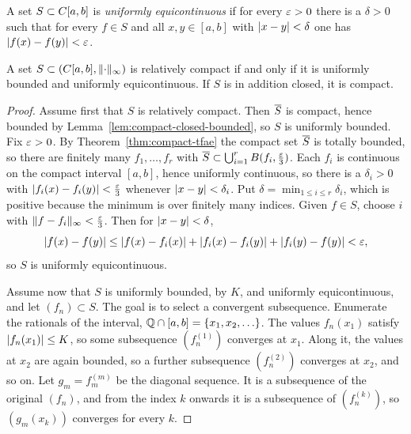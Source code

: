 \begin{definition}\label{def:equicont}
A set $S \subset C[a,b]$ is \emph{uniformly equicontinuous} if for every
$\varepsilon > 0$ there is a $\delta > 0$ such that for every $f \in S$ and all
$x, y \in [a,b]$ with $\lvert x-y\rvert < \delta$ one has
$\lvert f(x) - f(y)\rvert < \varepsilon$.
\end{definition}

\begin{theorem}\label{thm:arzela-ascoli}
A set $S \subset (C[a,b], \lVert\cdot\rVert_\infty)$ is relatively compact if
and only if it is uniformly bounded and uniformly equicontinuous. If $S$ is
in addition closed, it is compact.
\end{theorem}

\begin{proof}
Assume first that $S$ is relatively compact. Then $\overline{S}$ is compact, hence
bounded by Lemma~\ref{lem:compact-closed-bounded}, so $S$ is uniformly
bounded. Fix $\varepsilon > 0$. By Theorem~\ref{thm:compact-tfae} the compact set
$\overline{S}$ is totally bounded, so there are finitely many
$f_1, \dots, f_r$ with
$\overline{S} \subset \bigcup_{i=1}^{r} B(f_i, \frac{\varepsilon}{3})$. Each $f_i$ is
continuous on the compact interval $[a,b]$, hence uniformly continuous, so
there is a $\delta_i > 0$ with
$\lvert f_i(x) - f_i(y)\rvert < \frac{\varepsilon}{3}$ whenever $\lvert x - y\rvert < \delta_i$.
Put $\delta = \min_{1 \le i \le r} \delta_i$, which is positive because the
minimum is over finitely many indices. Given $f \in S$, choose $i$ with
$\lVert f - f_i\rVert_\infty < \frac{\varepsilon}{3}$. Then for $\lvert x-y\rvert < \delta$,
\[
  \lvert f(x) - f(y)\rvert
  \le \lvert f(x) - f_i(x)\rvert + \lvert f_i(x) - f_i(y)\rvert + \lvert f_i(y) - f(y)\rvert
  < \varepsilon ,
\]
so $S$ is uniformly equicontinuous.

Assume now that $S$ is uniformly bounded, by $K$, and uniformly
equicontinuous, and let $(f_n) \subset S$. The goal is to select a convergent
subsequence. Enumerate the rationals of the interval,
$\Q \cap [a,b] = \set{x_1, x_2, \dots}$. The values $f_n(x_1)$ satisfy
$\lvert f_n(x_1)\rvert \le K$, so some subsequence $(f^{(1)}_n)$ converges at $x_1$.
Along it, the values at $x_2$ are again bounded, so a further subsequence
$(f^{(2)}_n)$ converges at $x_2$, and so on. Let $g_m = f^{(m)}_m$ be the
diagonal sequence. It is a subsequence of the original $(f_n)$, and from the
index $k$ onwards it is a subsequence of $(f^{(k)}_n)$, so $(g_m(x_k))$
converges for every $k$.


\end{proof}

